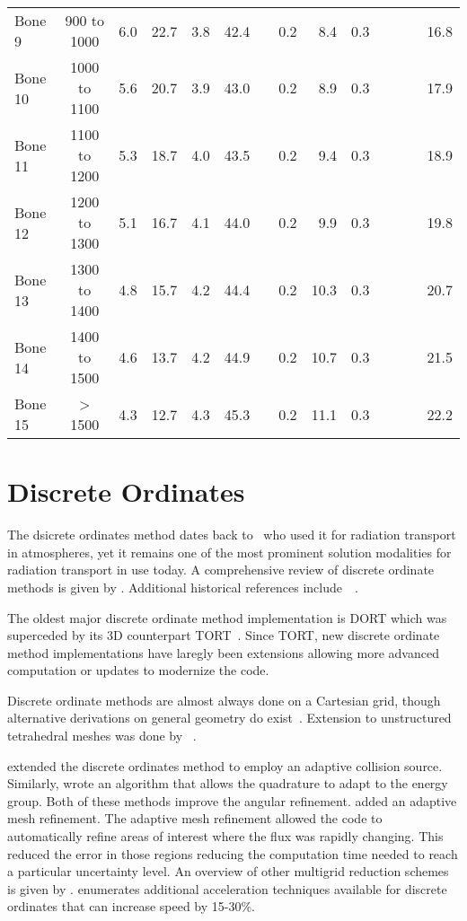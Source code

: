 \begin{sidewaystable}[ht]
\begin{tabular}{l c r r r r r r r r r r r r}
Bone 9      & 900 to 1000   &  6.0 & 22.7 &  3.8 & 42.4 &     & 0.2 &  8.4 & 0.3 &     &     &     & 16.8 \\ 
Bone 10     & 1000 to 1100  &  5.6 & 20.7 &  3.9 & 43.0 &     & 0.2 &  8.9 & 0.3 &     &     &     & 17.9 \\ 
Bone 11     & 1100 to 1200  &  5.3 & 18.7 &  4.0 & 43.5 &     & 0.2 &  9.4 & 0.3 &     &     &     & 18.9 \\ 
Bone 12     & 1200 to 1300  &  5.1 & 16.7 &  4.1 & 44.0 &     & 0.2 &  9.9 & 0.3 &     &     &     & 19.8 \\
Bone 13     & 1300 to 1400  &  4.8 & 15.7 &  4.2 & 44.4 &     & 0.2 & 10.3 & 0.3 &     &     &     & 20.7 \\
Bone 14     & 1400 to 1500  &  4.6 & 13.7 &  4.2 & 44.9 &     & 0.2 & 10.7 & 0.3 &     &     &     & 21.5 \\  
Bone 15     & > 1500        &  4.3 & 12.7 &  4.3 & 45.3 &     & 0.2 & 11.1 & 0.3 &     &     &     & 22.2 \\[1ex]
\hline
\end{tabular}
\label{table:ctmap}
\end{sidewaystable}

\section{Discrete Ordinates}\label{sec:discordlit}
The dsicrete ordinates method dates back to~\citet{ref:chandrasekahar} who used it for radiation transport in atmospheres, yet it remains one of the most prominent solution modalities for radiation transport in use today. A comprehensive review of discrete ordinate methods is given by \citet{ref:lewise}. Additional historical references include~\citet{ref:carlsonb}~\citet{ref:lanthropk}.

The oldest major discrete ordinate method implementation is DORT which was superceded by its 3D counterpart TORT~\citep{ref:rhoadesw}. Since TORT, new discrete ordinate method implementations have laregly been extensions allowing more advanced computation or updates to modernize the code.

Discrete ordinate methods are almost always done on a Cartesian grid, though alternative derivations on general geometry do exist~\citep{ref:dehartm}. Extension to unstructured tetrahedral meshes was done by ~\citet{ref:wareingt}.

\citet{ref:waltersw} extended the discrete ordinates method to employ an adaptive collision source. Similarly, \citet{ref:ahrensc} wrote an algorithm that allows the quadrature to adapt to the energy group. Both of these methods improve the angular refinement. \citet{ref:ibrahima} added an adaptive mesh refinement. The adaptive mesh refinement allowed the code to automatically refine areas of interest where the flux was rapidly changing. This reduced the error in those regions reducing the computation time needed to reach a particular uncertainty level. An overview of other multigrid reduction schemes is given by \citet{ref:leeb}. \citet{ref:efremenkod} enumerates additional acceleration techniques available for discrete ordinates that can increase speed by 15-30\%.

